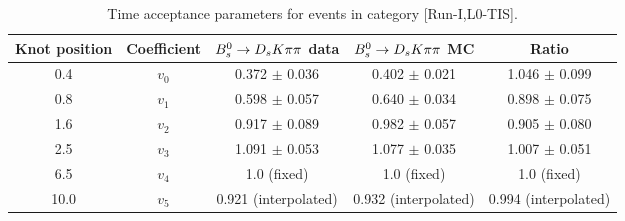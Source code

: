 \begin{table}[hp!]
\centering
\small
\caption{Time acceptance parameters for events in category [\textsf{Run-I},\textsf{L0-TIS}].}
\begin{tabular}{c c c c c}
\hline
\hline
Knot position & Coefficient & ${{B}^0_{s}}\rightarrow{\ensuremath{{D}_{s}}}{\ensuremath{K}}{\ensuremath{\pi}}{\ensuremath{\pi}}$ data & ${{B}^0_{s}}\rightarrow{\ensuremath{{D}_{s}}}{\ensuremath{K}}{\ensuremath{\pi}}{\ensuremath{\pi}}$ MC & Ratio \\
\hline
0.4 & $v_{0}$ & 0.372 $\pm$ 0.036 & 0.402 $\pm$ 0.021 & 1.046 $\pm$ 0.099\\
0.8 & $v_{1}$ & 0.598 $\pm$ 0.057 & 0.640 $\pm$ 0.034 & 0.898 $\pm$ 0.075\\
1.6 & $v_{2}$ & 0.917 $\pm$ 0.089 & 0.982 $\pm$ 0.057 & 0.905 $\pm$ 0.080\\
2.5 & $v_{3}$ & 1.091 $\pm$ 0.053 & 1.077 $\pm$ 0.035 & 1.007 $\pm$ 0.051\\
6.5 & $v_{4}$ &  1.0 (fixed) & 1.0 (fixed) & 1.0 (fixed)\\
10.0 & $v_{5}$ & 0.921 (interpolated) & 0.932 (interpolated) & 0.994 (interpolated) \\
\hline
\hline
\end{tabular}
\label{table:splines}
\end{table}